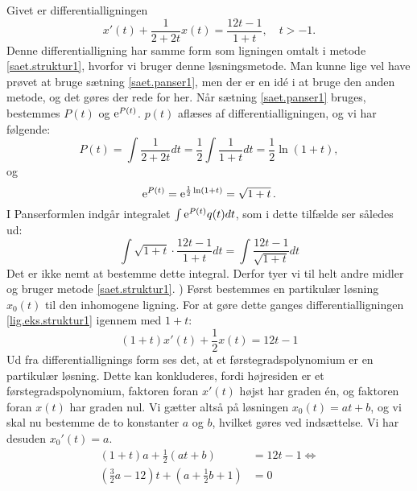 \begin{example} \label{eks.struktur1}
Givet er differentialligningen
\begin{equation} 
x'(t) + \frac{1}{2+2t}x(t) = \frac{12t-1}{1+t}, \quad t>-1. \label{lig.eks.struktur1} 
\end{equation}
Denne differentialligning har samme form som ligningen omtalt i metode \ref{saet.struktur1}, hvorfor vi bruger denne løsningsmetode. Man kunne lige vel have prøvet at bruge sætning \ref{saet.panser1}, men der er en idé i at bruge den anden metode, og det gøres der rede for her. \bs
Når sætning \ref{saet.panser1} bruges, bestemmes $ P(t) $ og $ \mathrm{e}^{P(t)} $. $ p(t) $ aflæses af differentialligningen, og vi har følgende:
\begin{equation}
P(t) = \int \frac{1}{2+2t}dt = \frac{1}{2} \int \frac{1}{1+t}dt = \frac{1}{2} \ln(1+t),
\end{equation}
og
\begin{equation}
\mathrm{e}^{P(t)} = \mathrm{e}^{\frac{1}{2} \ln(1+t)} = \sqrt{1+t} \,. \label{lig.eks.struktur2}
\end{equation}
I Panserformlen indgår integralet $ \int \mathrm{e}^{P(t)}q(t)dt $, som i dette tilfælde ser således ud:
\begin{equation}
\int \sqrt{1+t} \cdot \frac{12t-1}{1+t}dt = \int \frac{12t-1}{\sqrt{1+t}}dt
\end{equation}
Det er ikke nemt at bestemme dette integral. Derfor tyer vi til helt andre midler og bruger metode \ref{saet.struktur1}. ) Først bestemmes en partikulær løsning $ x_0(t) $ til den inhomogene ligning. For at gøre dette ganges differentialligningen \eqref{lig.eks.struktur1} igennem med $ 1 + t $:
\begin{equation} 
(1+t)x'(t) + \frac{1}{2}x(t) = 12t - 1 
\end{equation}
Ud fra differentiallignings form ses det, at et førstegradspolynomium er en partikulær løsning. Dette kan konkluderes, fordi højresiden er et førstegradspolynomium, faktoren foran $ x'(t) $ højst har graden én, og faktoren foran $ x(t) $ har graden nul. Vi gætter altså på løsningen $ x_0(t) = at + b $, og vi skal nu bestemme de to konstanter $ a $ og $ b $, hvilket gøres ved indsættelse. Vi har desuden $ x_0'(t) = a $.
\begin{equation}
\begin{aligned}
(1+t)a + \frac{1}{2}(at+b) &= 12t - 1 \Leftrightarrow \\
\left(\frac{3}{2}a - 12\right)t + \left(a + \frac{1}{2}b + 1\right) &= 0
\end{aligned}

\end{equation}
\end{example}
